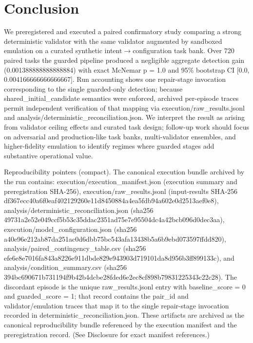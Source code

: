 \documentclass[conference]{IEEEtran}
\begin{document}
\section{Conclusion}
We preregistered and executed a paired confirmatory study comparing a strong deterministic validator with the same validator augmented by sandboxed emulation on a curated synthetic intent\ensuremath{\rightarrow}configuration task bank. Over 720 paired tasks the guarded pipeline produced a negligible aggregate detection gain (0.001388888888888884) with exact McNemar p = 1.0 and 95\% bootstrap CI [0.0, 0.004166666666666667]. Run accounting shows one repair-stage invocation corresponding to the single guarded-only detection; because shared\_initial\_candidate semantics were enforced, archived per-episode traces permit independent verification of that mapping via execution/raw\_results.jsonl and analysis/deterministic\_reconciliation.json. We interpret the result as arising from validator ceiling effects and curated task design; follow-up work should focus on adversarial and production-like task banks, multi-validator ensembles, and higher-fidelity emulation to identify regimes where guarded stages add substantive operational value.

Reproducibility pointers (compact). The canonical execution bundle archived by the run contains: execution/execution\_manifest.json (execution summary and preregistration SHA-256), execution/raw\_results.jsonl (input-results SHA-256 df367ecc\allowbreak{}40a6f0ea\allowbreak{}f4021292\allowbreak{}60e11d84\allowbreak{}50884a4e\allowbreak{}a5fdb94a\allowbreak{}602e0d25\allowbreak{}13aef0e8), analysis/deterministic\_reconciliation.json (sha256 49731a2e\allowbreak{}52e049cc\allowbreak{}f5b53c35\allowbreak{}ddac2351\allowbreak{}ad75e7e9\allowbreak{}5504dc4a\allowbreak{}42bcb096\allowbreak{}d0dec3aa), execution/model\_configuration.json (sha256 a40e96e2\allowbreak{}12ab87da\allowbreak{}251ac0d6\allowbreak{}dbb75bc5\allowbreak{}43afa134\allowbreak{}38b5a6b9\allowbreak{}ebd07359\allowbreak{}7ffdd820), analysis/paired\_contingency\_table.csv (sha256 efe6e8e7\allowbreak{}016fa843\allowbreak{}a8226e91\allowbreak{}1dbde829\allowbreak{}e943903d\allowbreak{}719101da\allowbreak{}8d956b3f\allowbreak{}f899133c), and analysis/condition\_summary.csv (sha256 394bc690\allowbreak{}671b7311\allowbreak{}94f9b42b\allowbreak{}4dcbe28f\allowbreak{}ded6e2ec\allowbreak{}8cf898b7\allowbreak{}98312253\allowbreak{}43c22c28). The discordant episode is the unique raw\_results.jsonl entry with baseline\_score = 0 and guarded\_score = 1; that record contains the pair\_id and validator/emulation traces that map it to the single repair-stage invocation recorded in deterministic\_reconciliation.json. These artifacts are archived as the canonical reproducibility bundle referenced by the execution manifest and the preregistration record. (See Disclosure for exact manifest references.)
\end{document}
